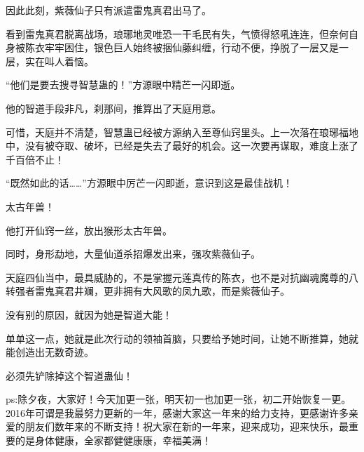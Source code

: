 \begin{this_body}
因此此刻，紫薇仙子只有派遣雷鬼真君出马了。

看到雷鬼真君脱离战场，琅琊地灵唯恐一干毛民有失，气愤得怒吼连连，但奈何自身被陈衣牢牢困住，银色巨人始终被捆仙藤纠缠，行动不便，挣脱了一层又是一层，实在叫人着恼。

“他们是要去搜寻智慧蛊的！”方源眼中精芒一闪即逝。

他的智道手段非凡，刹那间，推算出了天庭用意。

可惜，天庭并不清楚，智慧蛊已经被方源纳入至尊仙窍里头。上一次落在琅琊福地中，没有被夺取、破坏，已经是失去了最好的机会。这一次要再谋取，难度上涨了千百倍不止！

“既然如此的话……”方源眼中厉芒一闪即逝，意识到这是最佳战机！

太古年兽！

他打开仙窍一丝，放出猴形太古年兽。

同时，身形勐地，大量仙道杀招爆发出来，强攻紫薇仙子。

天庭四仙当中，最具威胁的，不是掌握元莲真传的陈衣，也不是对抗幽魂魔尊的八转强者雷鬼真君井斓，更非拥有大风歌的凤九歌，而是紫薇仙子。

没有别的原因，就因为她是智道大能！

单单这一点，她就是此次行动的领袖首脑，只要给予她时间，让她不断推算，她就能创造出无数奇迹。

必须先铲除掉这个智道蛊仙！

ps:除夕夜，大家好！今天加更一张，明天初一也加更一张，初二开始恢复一更。2016年可谓是我最努力更新的一年，感谢大家这一年来的给力支持，更感谢许多亲爱的朋友们数年来的不断支持！祝大家在新的一年来，迎来成功，迎来快乐，最重要的是身体健康，全家都健健康康，幸福美满！

\end{this_body}


